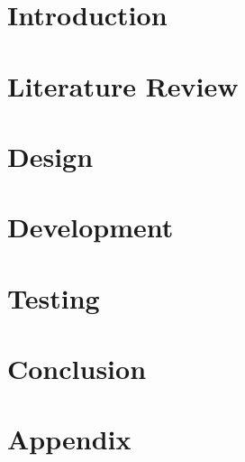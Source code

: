 \newpage
\chapter{Introduction}
\label{chap:intro}


\chapter{Literature Review}
\label{chap:litreview}


% 

\chapter{Design}
\label{chap:design}


\chapter{Development}
\label{chap:development}


\chapter{Testing}
\label{chap:testing}


\chapter{Conclusion}
\label{chap:conclusion}


\appendix
\chapter{Appendix}
\label{chap:appendix}
